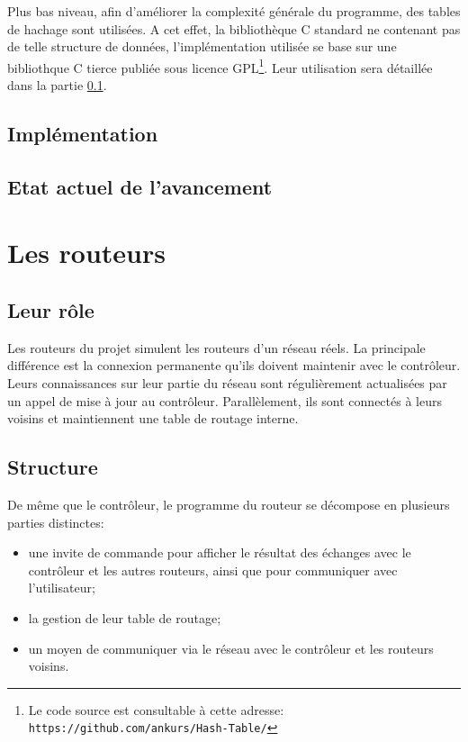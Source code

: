 \documentclass[a4paper,11pt]{article}
\begin{document}
Plus bas niveau, afin d'améliorer la complexité générale du programme, des tables de hachage sont utilisées. A cet effet, la bibliothèque C standard ne contenant pas de telle structure de données, l'implémentation utilisée se base sur une bibliothque C tierce publiée sous licence GPL\footnote{Le code source est consultable à cette adresse: \texttt{https://github.com/ankurs/Hash-Table/}}. Leur utilisation sera détaillée dans la partie \ref{implementation_controleur}.

\subsection{Implémentation}
\label{implementation_controleur}

\subsection{Etat actuel de l'avancement}

\section{Les routeurs}

\subsection{Leur rôle}

Les routeurs du projet simulent les routeurs d'un réseau réels. La principale différence est la connexion permanente qu'ils doivent maintenir avec le contrôleur. Leurs connaissances sur leur partie du réseau sont régulièrement actualisées par un appel de mise à jour au contrôleur. Parallèlement, ils sont connectés à leurs voisins et maintiennent une table de routage interne.

\subsection{Structure}

De même que le contrôleur, le programme du routeur se décompose en plusieurs parties distinctes:
\begin{itemize}
\item une invite de commande pour afficher le résultat des échanges avec le contrôleur et les autres routeurs, ainsi que pour communiquer avec l'utilisateur;
\item la gestion de leur table de routage;
\item un moyen de communiquer via le réseau avec le contrôleur et les routeurs voisins.
\end{itemize}
\end{document}
